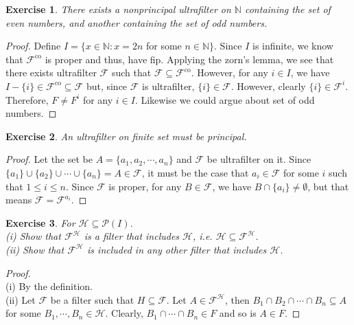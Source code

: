 \documentclass[a4paper, 11pt, openany]{book}
\theoremstyle{plain}
\newtheorem{exercise}{Exercise}[chapter]
\theoremstyle{plain}
\newcommand{\mc}{\mathcal}
\newcommand{\ms}{\mathscr}
\newcommand{\co}{\text{co}}
\newcommand{\N}{\mathbb{N}}
\begin{document}
  \begin{exercise}
    There exists a nonprincipal ultrafilter on $\N$ containing the set of even numbers, and another containing the set of odd numbers.
  \end{exercise}
  \begin{proof}
    Define $I=\{x \in \N: x=2n$ for some $n \in \N\}$. Since $I$ is infinite, we know that $\mc{F}^\co$ is proper and thus, have fip. Applying the zorn's lemma, we see that there exists ultrafilter $\mc{F}$ such that $\mc{F} \subseteq \mc{F}^\co$. However, for any $i \in I$, we have $I-\{i\} \in \mc{F}^\co \subseteq \mc{F}$ but, since $\mc{F}$ is ultrafilter, $\{i\} \in \mc{F}$. However, clearly $\{i\} \in \mc{F}^i$. Therefore, $F \not = F^i$ for any $i \in I$. Likewise we could argue about set of odd numbers.
  \end{proof}

  \begin{exercise}
    An ultrafilter on finite set must be principal.
  \end{exercise}
  \begin{proof}
    Let the set be $A=\{a_1,a_2,\cdots, a_n\}$ and $\mc{F}$ be ultrafilter on it. Since $\{a_1\} \cup \{a_2\}\cup \cdots \cup \{a_n\}=A \in \mc{F}$, it must be the case that $a_i \in \mc{F}$ for some $i$ such that $1 \leq i \leq n$. Since $\mc{F}$ is proper, for any $B \in \mc{F}$, we have $B \cap \{a_i\} \not = \emptyset$, but that means $\mc{F}=\mc{F}^{a_i}$.
  \end{proof}

  \begin{exercise}
    For $\mc{H} \subseteq \ms{P}(I)$. \\
      (i) Show that $\mc{F}^\mc{H}$ is a filter that includes $\mc{H}$, i.e. $\mc{H} \subseteq \mc{F}^\mc{H}$. \\
      (ii) Show that $\mc{F}^\mc{H}$ is included in any other filter that includes $\mc{H}$.
  \end{exercise}
  \begin{proof} $ $ \\
    (i) By the definition.\\
    (ii) Let $\mc{F}$ be a filter such that $H \subseteq \mc{F}$. Let $A \in \mc{F}^\mc{H}$, then $B_1 \cap B_2 \cap \cdots \cap B_n \subseteq A$ for some $B_1,\cdots, B_n \in \mc{H}$. Clearly, $B_1 \cap \cdots \cap B_n \in F$ and so is $A \in F$.
  \end{proof}
\end{document}
